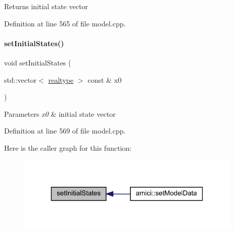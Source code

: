 \begin{DoxyReturn}{Returns}
initial state vector 
\end{DoxyReturn}


Definition at line 565 of file model.\+cpp.

\mbox{\label{classamici_1_1_model_ada7cb3dadf4cee4b8fd6f092fee54b3c}} 
\paragraph{\texorpdfstring{set\+Initial\+States()}{setInitialStates()}}
{\footnotesize\ttfamily void set\+Initial\+States (\begin{DoxyParamCaption}\item[{std\+::vector$<$ \mbox{\hyperlink{namespaceamici_a1bdce28051d6a53868f7ccbf5f2c14a3}{realtype}} $>$ const \&}]{x0 }\end{DoxyParamCaption})}


\begin{DoxyParams}{Parameters}
{\em x0} & initial state vector \\
\hline
\end{DoxyParams}


Definition at line 569 of file model.\+cpp.

Here is the caller graph for this function\+:
\nopagebreak
\begin{figure}[H]
\begin{center}
\leavevmode
\includegraphics[width=304pt]{classamici_1_1_model_ada7cb3dadf4cee4b8fd6f092fee54b3c_icgraph}
\end{center}
\end{figure}
\mbox{\label{classamici_1_1_model_a989b8202ceac7b6f94bb1503519a56fb}} 
